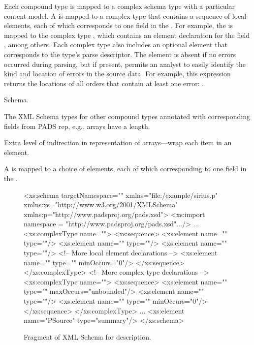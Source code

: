 Each compound type is mapped to a complex schema type with a
particular content model.  A  is mapped to a complex type
that contains a sequence of local elements, each of which corresponds
to one field in the .  For example, the 
 is mapped to the complex type
, which contains an element declaration for the
field , among others.  Each complex type also includes
an optional  element that corresponds to the type's parse
descriptor.  The  element is absent if no errors occurred
during parsing, but if present, permits an analyst to easily identify
the kind and location of errors in the source data.  For example, this
expression returns the locations of all orders that contain
at least one error: . 

Schema. 

The XML Schema types for other compound types annotated
with corresponding fields from PADS rep, e.g., arrays have a length. 


Extra level of indirection in representation of arrays---wrap each
item in an element. 

A  is mapped to a choice of elements, each of which
corresponding to one field in the . 


\begin{figure*}
\begin{small}
\begin{code}
<xs:schema targetNamespace=""
           xmlns="file:/example/sirius.p"
           xmlns:xs="http://www.w3.org/2001/XMLSchema"
           xmlns:p="http://www.padsproj.org/pads.xsd">
<xs:import namespace = "http://www.padsproj.org/pads.xsd".../>
...
<xs:complexType name="">
 <xs:sequence>
  <xs:element name=""     type=""/>
  <xs:element name="" type=""/>
  <xs:element name=""   type=""/>
  <!-- More local element declarations -->
  <xs:element name=""            type="" minOccurs="0"/>
 </xs:sequence>
</xs:complexType>
<!-- More complex type declarations -->
<xs:complexType name="">
 <xs:sequence>
  <xs:element name=""    type="" maxOccurs="unbounded"/>
  <xs:element name="" type=""/>
  <xs:element name=""     type="" minOccurs="0"/>
 </xs:sequence>
</xs:complexType>
...
<xs:element name="PSource" type="summary"/>
</xs:schema>
\end{code}
\end{small}
\caption{Fragment of XML Schema for \dibbler{} \pads{} description.}
\label{figure:dibbler-schema}
\end{figure*}

